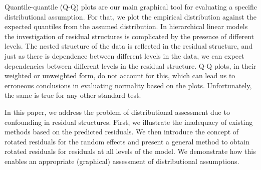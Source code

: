 \documentclass{article} %
\newcommand{\hh}[1]{{\color{orange} #1}}
\newcommand{\al}[1]{{\color{red} #1}}
\begin{document}
Quantile-quantile (Q-Q) plots \citep{Wilk:1968} are our main graphical tool for evaluating a specific distributional assumption. For that, we plot the empirical distribution against the expected quantiles from the assumed distribution. In hierarchical linear models the investigation of residual structures is complicated by the presence of  different levels. 
The nested structure of the data is reflected in the residual structure, and just as there is dependence between different levels in the data, we can expect dependencies between different levels in the residual structure. Q-Q plots, {in their} weighted \citep{Dempster:1985tr, Lange:1989uu} or unweighted {form}, do not account for this, which can lead us to erroneous conclusions in evaluating normality based on the plots. \hh{Unfortunately, the same is true for any other standard test. } %



In this paper, we address the problem of distributional assessment due to confounding in residual structures. 
First, we illustrate the inadequacy of existing methods  based on the predicted residuals. 
We then introduce  the concept of \al{rotated} residuals for the random effects and present a general method to obtain \al{rotated} residuals for residuals at all levels of the model. We demonstrate how this enables an appropriate (graphical) assessment  of distributional assumptions.
\end{document}
